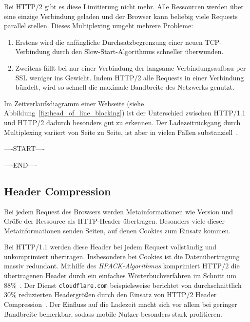 \documentclass[a4paper, justified, notoc]{tufte-handout} %
\begin{document}
Bei HTTP/2 gibt es diese Limitierung nicht mehr. Alle Ressourcen werden über eine einzige Verbindung geladen und der Browser kann beliebig viele Requests parallel stellen. Dieses Multiplexing umgeht mehrere Probleme: 
\begin{enumerate}
	\item Erstens wird die anfängliche Durchsatzbegrenzung einer neuen TCP-Verbindung durch den Slow-Start-Algorithmus schneller überwunden.
	\item  Zweitens fällt bei nur einer Verbindung der langsame Verbindungsaufbau per SSL weniger ins Gewicht. Indem HTTP/2 alle Requests in einer Verbindung bündelt, wird so schnell die maximale Bandbreite des Netzwerks genutzt.
\end{enumerate}

Im Zeitverlaufsdiagramm einer Webseite (siehe Abbildung~\ref{fig:head_of_line_blocking}) ist der Unterschied zwischen HTTP/1.1 und HTTP/2 dadurch besonders gut zu erkennen. Der Ladezeitrückgang durch Multiplexing variiert von Seite zu Seite, ist aber in vielen Fällen substanziell~\citep{heise:2018}.


----START----






----END----


\subsection{Header Compression} %
\label{sub:header_compression}

Bei jedem Request des Browsers werden Metainformationen wie Version und Größe der Ressource als HTTP-Header übertragen. Besonders viele dieser Metainformationen senden Seiten, auf denen Cookies zum Einsatz kommen.

Bei HTTP/1.1 werden diese Header bei jedem Request vollständig und unkomprimiert übertragen. Insbesondere bei Cookies ist die Datenübertragung massiv redundant. Mithilfe des \emph{HPACK-Algorithmus} komprimiert HTTP/2 die übertragenen Header durch ein einfaches Wörterbuchverfahren im Schnitt um 88\%~\citep{heise:2018}. Der Dienst \texttt{cloudflare.com} beispielsweise berichtet von durchschnittlich 30\% reduzierten Headergrößen durch den Einsatz von HTTP/2 Header Compression~\citep{vlad:2016}. Der Einfluss auf die Ladezeit macht sich vor allem bei geringer Bandbreite bemerkbar, sodass mobile Nutzer besonders stark profitieren.
\end{document}
